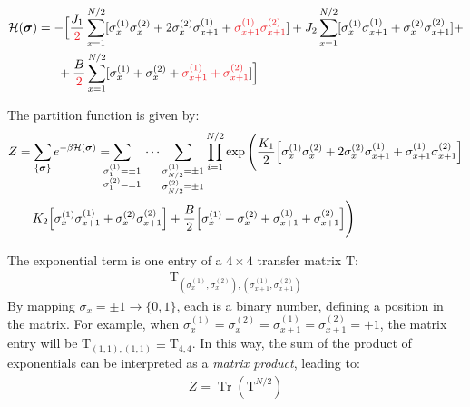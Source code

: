 \documentclass[12pt,a4paper]{report}
\begin{document}
\begin{align*}
    \mathcal{H}(\bm{\sigma}) &= 
    -\Big[
    \frac{J_1}{\textcolor{Red}{2}} \sum_{x=1}^{N/2} [\sigma_x^{(1)} \sigma_x^{(2)} + 2\sigma_x^{(2)} \sigma_{x+1}^{(1)} + \textcolor{Red}{\sigma_{x+1}^{(1)} \sigma_{x+1}^{(2)}}] +   
    J_{2} \sum_{x=1}^{N/2} [\sigma_x^{(1)} \sigma_{x+1}^{(1)} + \sigma_x^{(2)} \sigma_{x+1}^{(2)}] +\\
    &\quad\>\>\,+ \frac{B}{\textcolor{Red}{2}} \sum_{x=1}^{N/2}[\sigma_x^{(1)} + \sigma_x^{(2)} + \textcolor{Red}{\sigma_{x+1}^{(1)} + \sigma_{x+1}^{(2)}} ] \Big]
\end{align*}

The partition function is given by:
\begin{align*}
    Z &= \sum_{\{\bm{\sigma}\}} e^{-\beta \mathcal{H}(\bm{\sigma})} = \sum_{\mathclap{\substack{\sigma^{(1)}_1=\pm 1\\\sigma^{(2)}_1 = \pm 1}}}\quad \cdots \quad\sum_{\mathclap{\substack{\sigma^{(1)}_{N/2}=\pm 1\\\sigma^{(2)}_{N/2} = \pm 1}}}\quad \prod_{i=1}^{N/2} \exp \Bigg(\frac{K_1}{2}\Big[\sigma_x^{(1)} \sigma_x^{(2)} + 2\sigma_x^{(2)} \sigma_{x+1}^{(1)} + \sigma_{x+1}^{(1)} \sigma_{x+1}^{(2)}\Big] \\
    &\quad\> K_2 \Big[\sigma_x^{(1)} \sigma_{x+1}^{(1)} + \sigma_x^{(2)} \sigma_{x+1}^{(2)}\Big] + \frac{B}{2} \Big[\sigma_x^{(1)} + \sigma_x^{(2)} + \sigma_{x+1}^{(1)} + \sigma_{x+1}^{(2)} \Big] 
    \Bigg)
\end{align*}

The exponential term is one entry of a $4\times 4$ transfer matrix $\mathrm{T}$:
\begin{align*}
    \mathrm{T}_{(\sigma_x^{(1)}, \sigma_x^{(2)}), (\sigma_{x+1}^{(1)}, \sigma_{x+1}^{(2)})}
\end{align*}
By mapping $\sigma_x = \pm 1 \to \{0,1\}$, each  is a binary number, defining a position in the matrix. For example, when $\sigma_x^{(1)} = \sigma_{x}^{(2)} = \sigma_{x+1}^{(1)} = \sigma_{x+1}^{(2)} = +1$, the matrix entry will be $\mathrm{T}_{(1,1),(1,1)} \equiv \mathrm{T}_{4,4}$. In this way, the sum of the product of exponentials can be interpreted as a \textit{matrix product}, leading to:
\begin{align*}
    Z = \operatorname{Tr}(\mathrm{T}^{N/2}) 
\end{align*}%

\end{document}
